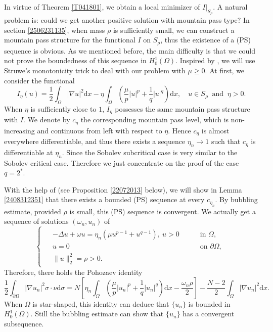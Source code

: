 \documentclass[10pt]{article}
\numberwithin{equation}{section}
\newcommand{\ud}{\mathrm{d}}
\numberwithin{equation}{section}
\begin{document}
In virtue of Theorem \ref{T041801}, we obtain a local minimizer of $I|_{S_\rho}$. A natural problem is: could we get another positive solution with mountain pass type?  In section \ref{2506231135}, when mass $\rho$ is sufficiently small, we can construct a mountain pass structure for the functional $I$ on $S_\rho$, thus the existence of a (PS) sequence is obvious. As we mentioned before,  the main difficulty is that we could not prove the boundedness of this sequence in $H_0^1(\Omega)$. Inspired by \cite{Pierotti25}, we will use Struwe's monotonicity trick to deal with our problem with $\mu\ge 0$. At first, we consider the functional
\[
I_{\eta}(u)=\frac{1}{2}\int_{\Omega}|\nabla u|^2 \ud x
-\eta\int_{\Omega}\left(\frac{\mu}{p} |u|^p+\frac1{q}|u|^{q}\right)  \ud x,\quad u\in S_\rho\;\;\mbox{and}\;\; \eta>0.
\]
When $\eta$ is sufficiently close to $1$, $I_\eta$  possesses the same mountain pass structure with $I$. We denote by $c_\eta$ the corresponding mountain pass level, which is non-increasing and continuous from left with respect to $\eta$. Hence $c_\eta$ is almost everywhere differentiable, and thus there exists a sequence $\eta_n\to 1$ such that $c_{\eta}$ is differentiable at $\eta_n$. Since the Sobolev subcritical case is very similar to the Sobolev critical case. Therefore we just concentrate on the proof of the case $q=2^*$.

With the help of \cite[Theorem 4.5]{Ghoussoub1993} (see Proposition \ref{22072013} below), we will show in Lemma \ref{2408312351} that there exists a bounded (PS) sequence at every $c_{\eta_n}$. By bubbling estimate, provided $\rho$ is small, this (PS) sequence is convergent. We actually get  a sequence of solutions $(\omega_{n}, u_{n})$ of
\begin{equation*}
\begin{cases}
\begin{aligned}
&-\Delta u+\omega u=\eta_n\left(\mu u^{p-1}+u^{q-1}\right),~ u>0 \quad &&\text { in } \Omega, \\
&u=0  &&\text { on } \partial\Omega, \\
&\|u\|_2^2=\rho>0.
\end{aligned}
\end{cases}
\end{equation*}
Therefore,  there holds the Pohozaev identity
\begin{equation}\label{2408291040}
\frac12\int_{\partial \Omega}|\nabla u_n|^2\sigma\cdot \nu \ud\sigma=N\left[\eta_n\int_{\Omega}\left(\frac{\mu}{p} |u_n|^p+\frac1{q}|u_n|^{q}\right)\ud x-\frac{\omega_n\rho}{2}\right]-\frac{N-2}{2}\int_{\Omega}|\nabla u_n|^2 \ud x.
\end{equation}
When $\Omega$ is star-shaped, this identity can deduce that $\{u_n\}$ is bounded in $H_0^1(\Omega)$. Still the bubbling estimate can show that $\{u_n\}$ has a  convergent subsequence.
\end{document}
